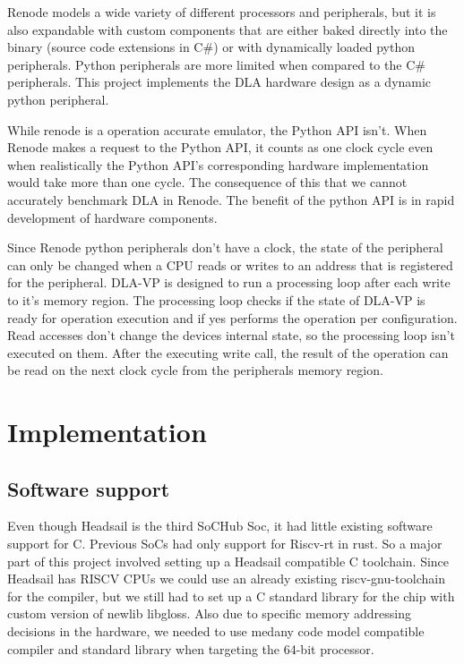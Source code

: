 \documentclass[12pt,a4paper,english
]{tunithesis}
\begin{document}
Renode models a wide variety of different processors and peripherals, but it is also expandable with custom components that are either baked directly into the binary (source code extensions in C\#) or with dynamically loaded python peripherals. Python peripherals are more limited when compared to the C\# peripherals. This project implements the DLA hardware design as a dynamic python peripheral.

While renode is a operation accurate emulator, the Python API isn't. When Renode makes a request to the Python API, it counts as one clock cycle even when realistically the Python API's corresponding hardware implementation would take more than one cycle. The consequence of this that we cannot accurately benchmark DLA in Renode. The benefit of the python API is in rapid development of hardware components.

Since Renode python peripherals don't have a clock, the state of the peripheral can only be changed when a CPU reads or writes to an address that is registered for the peripheral. DLA-VP is designed to run a processing loop after each write to it's memory region. The processing loop checks if the state of DLA-VP is ready for operation execution and if yes performs the operation per configuration. Read accesses don't change the devices internal state, so the processing loop isn't executed on them. After the executing write call, the result of the operation can be read on the next clock cycle from the peripherals memory region.

\chapter{Implementation}
\label{ch:implementation}

\section{Software support}
\label{sec:software_support}
Even though Headsail is the third SoCHub Soc, it had little existing software support for C. Previous SoCs had only support for Riscv-rt in rust. So a major part of this project involved setting up a Headsail compatible C toolchain. Since Headsail has RISCV CPUs we could use an already existing riscv-gnu-toolchain for the compiler, but we still had to set up a C standard library for the chip with custom version of newlib libgloss. Also due to specific memory addressing decisions in the hardware, we needed to use medany code model compatible compiler and standard library when targeting the 64-bit processor.
\end{document}
